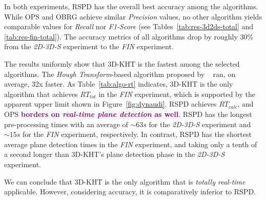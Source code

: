 \documentclass[main.tex]{subfiles}
\begin{document}

In both experiments, RSPD has the overall best accuracy among the algorithms. While OPS and OBRG achieve similar \textit{Precision} values, no other algorithm yields comparable values for \textit{Recall} nor \textit{F1-Score} (see Tables~\ref{tab:res-3d2ds-total} and \ref{tab:res-fin-total}). The accuracy metrics of all algorithms drop by roughly $30\%$ from the \textit{2D-3D-S} experiment to the \textit{FIN} experiment.

The results uniformly show that 3D-KHT is the fastest among the selected algorithms. The \textit{Hough Transform}-based algorithm proposed by \citeauthor{LimbergerOliveira2015HT3D}~\cite{LimbergerOliveira2015HT3D} ran, on average, 32x faster. As Table~\ref{tab:algo-rt} indicates, 3D-KHT is the only algorithm that achieves $RT_{tot}$ in the \textit{FIN} experiment, which is supported by the apparent upper limit shown in Figure~\ref{fig:dynaudi}. RSPD achieves $RT_{calc}$, and OPS \textbf{\textcolor{purple}{borders on \textit{real-time plane detection} as well}}. RSPD has the longest pre-processing times with an average of ${\sim}63s$ for the \textit{2D-3D-S} experiment and ${\sim}15s$ for the \textit{FIN} experiment, respectively. In contrast, RSPD has the shortest average plane detection times in the \textit{FIN} experiment, and taking only a tenth of a second longer than 3D-KHT's plane detection phase in the \textit{2D-3D-S} experiment.

We can conclude that 3D-KHT is the only algorithm that is \textit{totally real-time} applicable. However, considering accuracy, it is comparatively inferior to RSPD.
\end{document}
